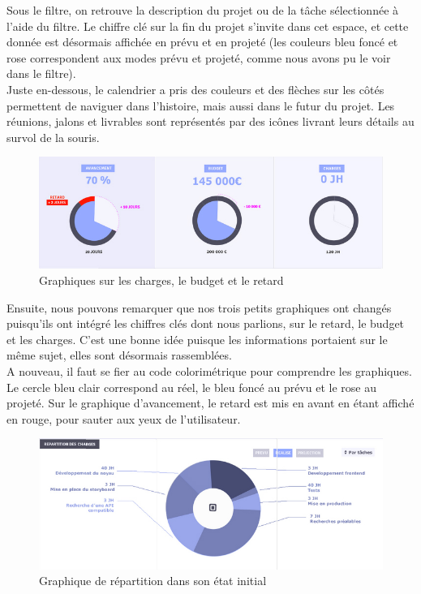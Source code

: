 \documentclass[12pt]{report}
\begin{document}
Sous le filtre, on retrouve la description du projet ou de la tâche sélectionnée à l'aide du filtre. Le chiffre clé sur la fin du projet s'invite dans cet espace, et cette donnée est désormais affichée en prévu et en projeté (les couleurs bleu foncé et rose correspondent aux modes prévu et projeté, comme nous avons pu le voir dans le filtre).\\
Juste en-dessous, le calendrier a pris des couleurs et des flèches sur les côtés permettent de naviguer dans l'histoire, mais aussi dans le futur du projet. Les réunions, jalons et livrables sont représentés par des icônes livrant leurs détails au survol de la souris.\\

\begin{figure}[H]
	\centering
	\includegraphics[width=1\textwidth]{pictures/maquetteVersusmind/3graphs.jpg}
	\caption{Graphiques sur les charges, le budget et le retard}
	\label{14}
\end{figure}

Ensuite, nous pouvons remarquer que nos trois petits graphiques ont changés puisqu'ils ont intégré les chiffres clés dont nous parlions, sur le retard, le budget et les charges. C'est une bonne idée puisque les informations portaient sur le même sujet, elles sont désormais rassemblées.\\

A nouveau, il faut se fier au code colorimétrique pour comprendre les graphiques. Le cercle bleu clair correspond au réel, le bleu foncé au prévu et le rose au projeté. Sur le graphique d'avancement, le retard est mis en avant en étant affiché en rouge, pour sauter aux yeux de l'utilisateur.\\

\begin{figure}[H]
	\centering
	\includegraphics[width=1\textwidth]{pictures/maquetteVersusmind/repartitionInit.jpg}
	\caption{Graphique de répartition dans son état initial}
	\label{12}
\end{figure}
\end{document}
